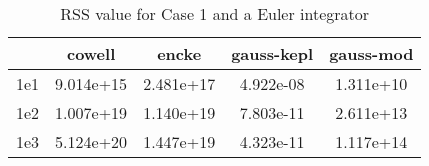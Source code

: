 \begin{table}
\centering
\begin{tabular}{|c|c|c|c|c|}
\hline
 & cowell & encke & gauss-kepl & gauss-mod \\
\hline
1e1 & 9.014e+15 & 2.481e+17 & 4.922e-08 & 1.311e+10 \\
\hline
1e2 & 1.007e+19 & 1.140e+19 & 7.803e-11 & 2.611e+13 \\
\hline
1e3 & 5.124e+20 & 1.447e+19 & 4.323e-11 & 1.117e+14 \\
\hline
\end{tabular}
\caption{RSS value for Case 1 and a Euler integrator}
\label{table:tab:keplerapprox_rss_C1_Euler}
\end{table}
